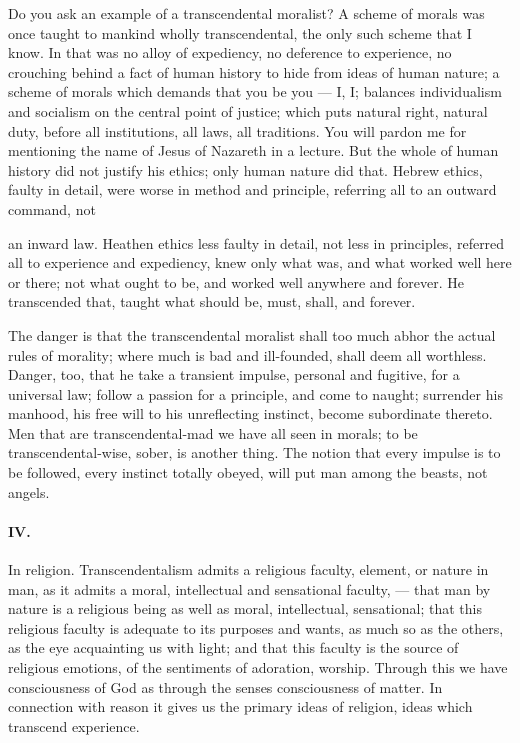 \documentclass[12pt]{article}
\begin{document}
Do you ask an example of a transcendental moralist? 
A scheme of morals was once taught to mankind wholly 
transcendental, the only such scheme that I know. In 
that was no alloy of expediency, no deference to experience, no crouching behind a fact of human history to 
hide from ideas of human nature; a scheme of morals 
which demands that you be you --- I, I; balances individualism and socialism on the central point of justice; which puts natural right, natural duty, before all 
institutions, all laws, all traditions. You will pardon 
me for mentioning the name of Jesus of Nazareth in 
a lecture. But the whole of human history did not 
justify his ethics; only human nature did that. Hebrew ethics, faulty in detail, were worse in method and 
principle, referring all to an outward command, not 




an inward law. Heathen ethics less faulty in detail, 
not less in principles, referred all to experience and 
expediency, knew only what was, and what worked well 
here or there; not what ought to be, and worked well 
anywhere and forever. He transcended that, taught 
what should be, must, shall, and forever. 

The danger is that the transcendental moralist shall 
too much abhor the actual rules of morality; where 
much is bad and ill-founded, shall deem all worthless. 
Danger, too, that he take a transient impulse, personal 
and fugitive, for a universal law; follow a passion for 
a principle, and come to naught; surrender his manhood, his free will to his unreflecting instinct, become 
subordinate thereto. Men that are transcendental-mad 
we have all seen in morals; to be transcendental-wise, 
sober, is another thing. The notion that every impulse 
is to be followed, every instinct totally obeyed, will put 
man among the beasts, not angels. 

\paragraph{IV.} In religion. Transcendentalism admits a religious faculty, element, or nature in man, as it admits 
a moral, intellectual and sensational faculty, --- that 
man by nature is a religious being as well as moral, intellectual, sensational; that this religious faculty is adequate to its purposes and wants, as much so as the others, as the eye acquainting us with light; and that this 
faculty is the source of religious emotions, of the sentiments of adoration, worship. Through this we have 
consciousness of God as through the senses consciousness 
of matter. In connection with reason it gives us the 
primary ideas of religion, ideas which transcend experience. 
\end{document}
